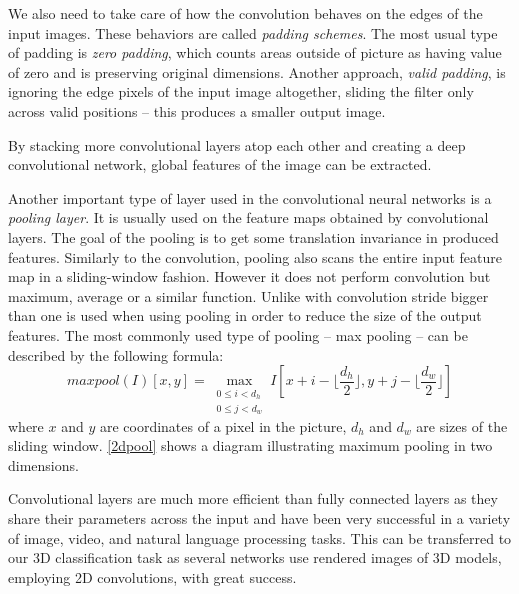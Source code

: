 We also need to take care of how the convolution behaves on the edges of the input images. These behaviors are called \textit{padding schemes}. The most usual type of padding is \textit{zero padding}, which counts areas outside of picture as having value of zero and is preserving original dimensions. Another approach, \textit{valid padding}, is ignoring the edge pixels of the input image altogether, sliding the filter only across valid positions -- this produces a smaller output image. \par
By stacking more convolutional layers atop each other and creating a deep convolutional network,  global features of the image can be extracted. 
\par
Another important type of layer used in the convolutional neural networks is a \textit{pooling layer}. It is usually used on the feature maps obtained by convolutional layers. The goal of the pooling is to get some translation invariance in produced features. Similarly to the convolution, pooling also scans the entire input feature map in a sliding-window fashion. However it does not perform convolution but maximum, average or a similar function. Unlike with convolution stride bigger than one is used when using pooling in order to reduce the size of the output features.
The most commonly used type of pooling -- max pooling -- can be described by the following formula: 
$$maxpool(I)[x,y] =
\max_{\substack{0 \leq i < d_h\\
		0 \leq j < d_w}}
I[x + i - \lfloor \frac{d_h}{2} \rfloor, y + j - \lfloor \frac{d_w}{2}  \rfloor ] $$ where $x$ and $y$ are coordinates of a pixel in the picture, $d_h$ and $d_w$ are sizes of the sliding window. \autoref{2dpool} shows a diagram illustrating maximum pooling in two dimensions.\par
Convolutional layers are much more efficient than fully connected layers as they share their parameters across the input and have been very successful in a variety of image, video, and natural language processing tasks. This  can be transferred to our 3D classification task as several networks use rendered images of 3D models, employing 2D convolutions, with great success. 



